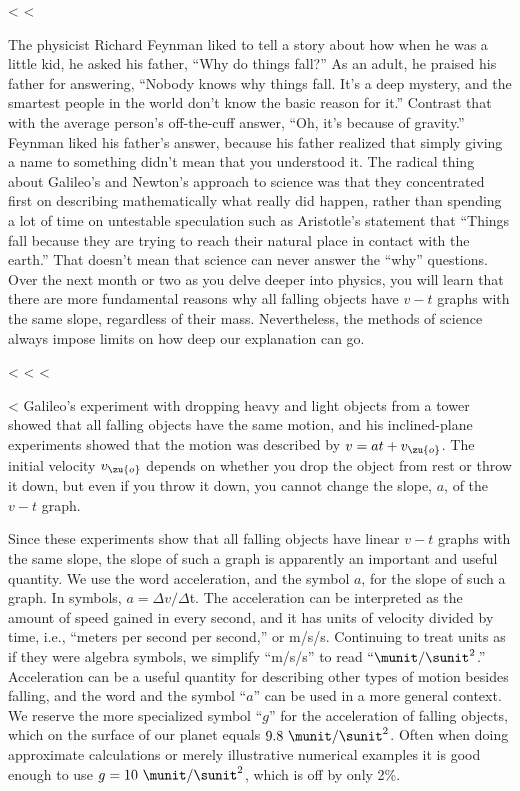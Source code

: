 <%
<%

The physicist Richard Feynman liked to tell a story about how when he was
a little kid, he asked his father, ``Why do things fall?''
As an adult, he praised his father for answering, ``Nobody
knows why things fall. It's a deep mystery, and the smartest
people in the world don't know the basic reason for it.''
Contrast that with the average person's off-the-cuff answer,
``Oh, it's because of gravity.'' Feynman liked his father's
answer, because his father realized that simply giving a
name to something didn't mean that you understood it. The
radical thing about Galileo's and Newton's approach to
science was that they concentrated first on describing
mathematically what really did happen, rather than spending
a lot of time on untestable speculation such as Aristotle's
statement that ``Things fall because they are trying to
reach their natural place in contact with the earth.'' That
doesn't mean that science can never answer the ``why''
questions. Over the next month or two as you delve deeper
into physics, you will learn that there are more fundamental
reasons why all falling objects have $v-t$ graphs with the
same slope, regardless of their mass. Nevertheless, the
methods of science always impose limits on how deep
our explanation can go.

<%
<%
<%

<%
Galileo's experiment with dropping heavy and light objects
from a tower showed that all falling objects have the same
motion, and his inclined-plane experiments showed that the
motion was described by $v=at+v_\zu{o}$. The initial
velocity $v_\zu{o}$ depends on whether you drop the object from rest
or throw it down, but even if you throw it down, you cannot
change the slope, $a$, of the $v-t$ graph.

Since these experiments show that all falling objects have
linear $v-t$ graphs with the same slope, the slope of such a
graph is apparently an important and useful quantity. We use
the word acceleration, and the symbol
$a$, for the slope of such a graph. In symbols, $a=\Delta v/\Delta $t.
The acceleration can be interpreted as the
amount of speed gained in every second, and it has units of
velocity divided by time, i.e., ``meters per second per
second,'' or m/s/s. Continuing to treat units as if they
were algebra symbols, we simplify ``m/s/s'' to read
$``\munit/\sunit^2$.'' Acceleration can be a useful quantity for
describing other types of motion besides falling, and the
word and the symbol ``$a$'' can be used in a more general
context. We reserve the more specialized symbol ``$g$'' for
the acceleration of falling objects, which on the surface of
our planet equals $9.8\ \munit/\sunit^2$. Often when doing approximate
calculations or merely illustrative numerical examples it is
good enough to use $g=10\ \munit/\sunit^2$, which is off by only 2\%.

